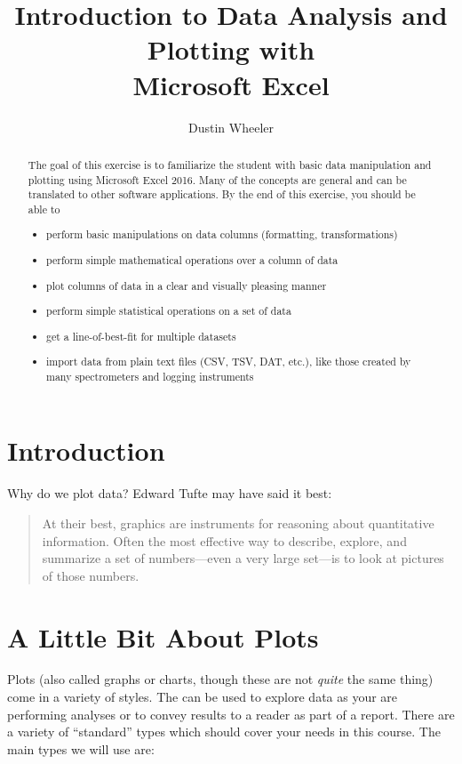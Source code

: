\documentclass[nobib,nofonts,nols,nohyper]{tufte-handout}
\title{Introduction to Data Analysis and Plotting with \\ Microsoft Excel}
\author{Dustin Wheeler}
\begin{document}
\maketitle

\begin{abstract}
	\noindent
	The goal of this exercise is to familiarize the student with basic data manipulation and plotting using Microsoft Excel 2016. 
	Many of the concepts are general and can be translated to other software applications. 
	By the end of this exercise, you should be able to 
	\begin{itemize}
		\item perform basic manipulations on data columns (formatting, transformations) 
		\item perform simple mathematical operations over a column of data 
		\item plot columns of data in a clear and visually pleasing manner
		\item perform simple statistical operations on a set of data
		\item get a line-of-best-fit for multiple datasets
		\item import data from plain text files (CSV, TSV, DAT, etc.), like those created by many spectrometers and logging instruments
	\end{itemize}
\end{abstract}

\section{Introduction} %
\label{sec:intro}

Why do we plot data? Edward Tufte may have said it best:

\begin{quote}
	At their best, graphics are instruments for reasoning about quantitative information. 
	Often the most effective way to describe, explore, and summarize a set of numbers---even a very large set---is to look at pictures of those numbers.
\end{quote}

\section{A Little Bit About Plots} %
\label{sec:a-little-bit-about-plots}

Plots (also called graphs or charts, though these are not \emph{quite} the same thing) come in a variety of styles. 
The can be used to explore data as your are performing analyses or to convey results to a reader as part of a report. 
There are a variety of ``standard'' types which should cover your needs in this course. 
The main types we will use are:
\end{document}
